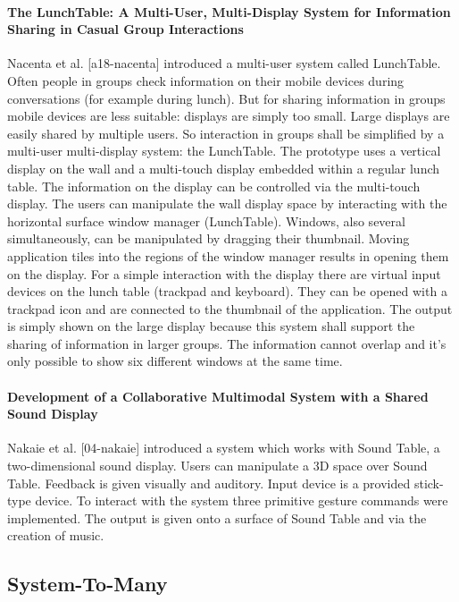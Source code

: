 \paragraph{The LunchTable: A Multi-User, Multi-Display System for Information Sharing in Casual Group Interactions}
Nacenta et al. [a18-nacenta] introduced a multi-user system called LunchTable. Often people in groups check information on their mobile devices during conversations (for example during lunch). But for sharing information in groups mobile devices are less suitable: displays are simply too small. Large displays are easily shared by multiple users. So interaction in groups shall be simplified by a multi-user multi-display system: the LunchTable. The prototype uses a vertical display on the wall and a multi-touch display embedded within a regular lunch table. The information on the display can be controlled via the multi-touch display.
The users can manipulate the wall display space by interacting with the horizontal surface window manager (LunchTable). Windows, also several simultaneously, can be manipulated by dragging their thumbnail. Moving application tiles into the regions of the window manager results in opening them on the display. For a simple interaction with the display there are virtual input devices on the lunch table (trackpad and keyboard). They can be opened with a trackpad icon and are connected to the thumbnail of the application. The output is simply shown on the large display because this system shall support the sharing of information in larger groups. The information cannot overlap and it’s only possible to show six different windows at the same time.

\paragraph{Development of a Collaborative Multimodal System with a Shared Sound Display}
Nakaie et al. [04-nakaie] introduced a system which works with Sound Table, a two-dimensional sound display. Users can manipulate a 3D space over Sound Table. Feedback is given visually and auditory. Input device is a provided stick-type device. To interact with the system three primitive gesture commands were implemented. The output is given onto a surface of Sound Table and via the creation of music.

\subsection{System-To-Many}

